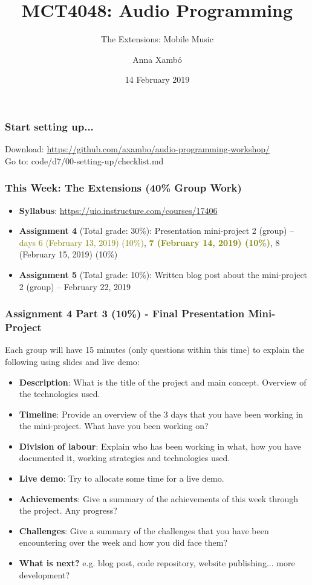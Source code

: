 \documentclass[screen, aspectratio=43]{beamer}
\title[AP-intro]{MCT4048: Audio Programming}
\subtitle{The Extensions: Mobile Music}
\author[A. Xamb{\'o}]{Anna Xamb{\'o}}
\institute[NTNU]{Department of Music, NTNU}
\date{14 February 2019}
\begin{document}
\begin{frame}
  \titlepage
\end{frame}

%
\begin{frame}
\frametitle{Start setting up...}
Download: \url{https://github.com/axambo/audio-programming-workshop/} 
\\
\vspace{10 mm}
Go to: \textrm{code/d7/00-setting-up/checklist.md}
\end{frame}
%
\begin{frame}
\frametitle{This Week: The Extensions (40\% Group Work)}
\begin{itemize}
\item \textbf{Syllabus}: \url{https://uio.instructure.com/courses/17406}
\item \textbf{Assignment 4} (Total grade: 30\%): Presentation mini-project 2 (group) -- \textcolor{olive}{days 6 (February 13, 2019) (10\%)},  \textbf{\textcolor{olive}{7 (February 14, 2019) (10\%)}}, 8 (February 15, 2019) (10\%)
\item \textbf{Assignment 5} (Total grade: 10\%):  Written blog post about the mini-project 2 (group) -- February 22, 2019
\end{itemize}
\end{frame}
%
\begin{frame}
\frametitle{Assignment 4 Part 3 (10\%) - Final Presentation Mini-Project}
Each group will have 15 minutes (only questions within this time) to explain the following using slides and live demo:
\begin{itemize}
\item \textbf{Description}: What is the title of the project and main concept. Overview of the technologies used.
\item \textbf{Timeline}: Provide an overview of the 3 days that you have been working in the mini-project. What have you been working on?
\item \textbf{Division of labour}: Explain who has been working in what, how you have documented it, working strategies and technologies used.
\item  \textbf{Live demo}: Try to allocate some time for a live demo.
\item \textbf{Achievements}: Give a summary of the achievements of this week through the project. Any progress?
\item \textbf{Challenges}: Give a summary of the challenges that you have been encountering over the week and how you did face them?
\item \textbf{What is next?} e.g. blog post, code repository, website publishing... more development?
\end{itemize}
\end{frame}
\end{document}
